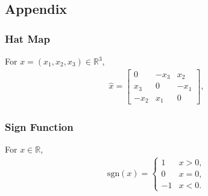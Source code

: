 \documentclass[10pt]{article}
\renewcommand{\Re}{\ensuremath{\mathbb{R}}}
\begin{document}



\appendix

\subsection*{Appendix}

\subsubsection*{Hat Map}

For $x=(x_1,x_2,x_3)\in\Re^3$, 
\begin{align}
    \hat x = \begin{bmatrix}
        0 & -x_3 & x_2 \\
        x_3 & 0 & -x_1 \\
        -x_2 & x_1 & 0 
    \end{bmatrix},
\end{align}


\subsubsection*{Sign Function}

For $x\in\Re$, 
\begin{align}
    \mathrm{sgn}(x) =
    \begin{cases}
        1 &  x>0,\\
        0 &  x=0,\\
        -1 & x<0.
    \end{cases}
\end{align}

\clearpage\newpage
{}
\recalctypearea
\end{document}
